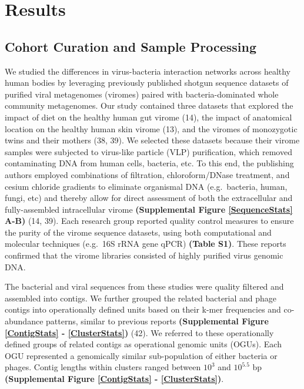 \documentclass[12pt,]{article}
\begin{document}
\section{Results}\label{results}

\subsection{Cohort Curation and Sample
Processing}\label{cohort-curation-and-sample-processing}

We studied the differences in virus-bacteria interaction networks across
healthy human bodies by leveraging previously published shotgun sequence
datasets of purified viral metagenomes (viromes) paired with
bacteria-dominated whole community metagenomes. Our study contained
three datasets that explored the impact of diet on the healthy human gut
virome (14), the impact of anatomical location on the healthy human skin
virome (13), and the viromes of monozygotic twins and their mothers (38,
39). We selected these datasets because their virome samples were
subjected to virus-like particle (VLP) purification, which removed
contaminating DNA from human cells, bacteria, etc. To this end, the
publishing authors employed combinations of filtration, chloroform/DNase
treatment, and cesium chloride gradients to eliminate organismal DNA
(e.g.~bacteria, human, fungi, etc) and thereby allow for direct
assessment of both the extracellular and fully-assembled intracellular
virome \textbf{(Supplemental Figure \ref{SequenceStats} A-B)} (14, 39).
Each research group reported quality control measures to ensure the
purity of the virome sequence datasets, using both computational and
molecular techniques (e.g.~16S rRNA gene qPCR) \textbf{(Table S1)}.
These reports confirmed that the virome libraries consisted of highly
purified virus genomic DNA.

The bacterial and viral sequences from these studies were quality
filtered and assembled into contigs. We further grouped the related
bacterial and phage contigs into operationally defined units based on
their k-mer frequencies and co-abundance patterns, similar to previous
reports \textbf{(Supplemental Figure \ref{ContigStats} -
\ref{ClusterStats})} (42). We referred to these operationally defined
groups of related contigs as operational genomic units (OGUs). Each OGU
represented a genomically similar sub-population of either bacteria or
phages. Contig lengths within clusters ranged between \(10^{3}\) and
\(10^{5.5}\) bp \textbf{(Supplemental Figure \ref{ContigStats} -
\ref{ClusterStats})}.
\end{document}
